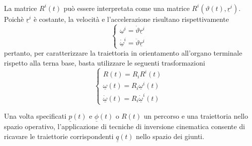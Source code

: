 \paragraph{}
La matrice $R^i(t)$ può essere interpretata come una matrice $R^i(\vartheta(t), \underline{r}^i)$. Poichè $\underline{r}^i$ è costante, la velocità e l'accelerazione risultano rispettivamente
\begin{equation}
	\begin{cases}
		\underline{\omega}^i = \dot{\vartheta} \underline{r}^i \\
		\underline{\dot{\omega}}^i = \ddot{\vartheta} \underline{r}^i
	\end{cases}
\end{equation}
pertanto, per caratterizzare la traiettoria in orientamento all'organo terminale rispetto alla terna base, basta utilizzare le seguenti trasformazioni
\begin{equation}
	\begin{cases}
		R(t) = R_iR^i(t) \\
		\underline{\omega}(t) = R_i \underline{\omega}^i(t) \\
		\dot{\underline{\omega}}(t) = R_i \dot{\underline{\omega}}^i(t)
	\end{cases}
\end{equation}

Una volta specificati $\underline{p}(t)$ e $\underline{\phi}(t)$ o $R(t)$ un percorso e una traiettoria nello spazio operativo, l'applicazione di tecniche di inversione cinematica consente di ricavare le traiettorie corrispondenti $\underline{q}(t)$ nello spazio dei giunti.

 